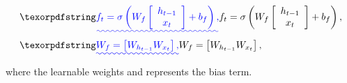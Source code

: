 \begin{align}
	&\DIFadd{f_{t}=\sigma\left( W_{f}  
	\left[
	\begin{array}{c}
		h_{t-1} \\ x_{t}
	\end{array} 
	\right]
	+ b_{f} \right), }\\
	&\DIFadd{W_{f} = \left[ W_{h_{t-1}}  W_{x_{t}} \right],
	\label{eq:eq1}
}\end{align}\DIFaddend 
where \DIFdelbegin {}\DIFdelend \DIFaddbegin {}\DIFaddend the learnable weights \DIFdelbegin \DIFdel{, }\DIFdelend \DIFaddbegin {}\DIFaddend and \DIFdelbegin {}\DIFdelend \DIFaddbegin {}\DIFaddend represents the bias term. 

